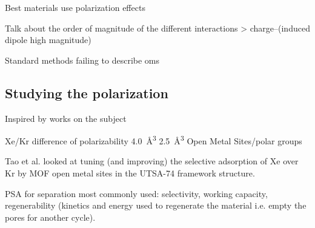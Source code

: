 \documentclass[main]{subfiles}
\begin{document}
Best materials use polarization effects \autocite{Li_2019,Pei_2022}


Talk about the order of magnitude of the different interactions > charge--(induced dipole high magnitude)

Standard methods failing to describe oms\autocite{Perry_2014} 


\subsection{Studying the polarization}



Inspired by works on the subject\autocite{Lachet_1998,Becker_2017} 


Xe/Kr difference of polarizability \SI{4.0}{\cubic\angstrom} \SI{2.5}{\cubic\angstrom}\autocite{Olney1997}
Open Metal Sites/polar groups

Tao et al.\autocite{Tao_2020} looked at tuning (and improving) the selective adsorption of Xe over Kr by MOF open metal sites in the UTSA-74 framework structure.



PSA for separation most commonly used: selectivity, working capacity, regenerability (kinetics and energy used to regenerate the material i.e. empty the pores for another cycle).\autocite{Kumar_1994}

\OnlyInSubfile{\printglobalbibliography}
\end{document}
